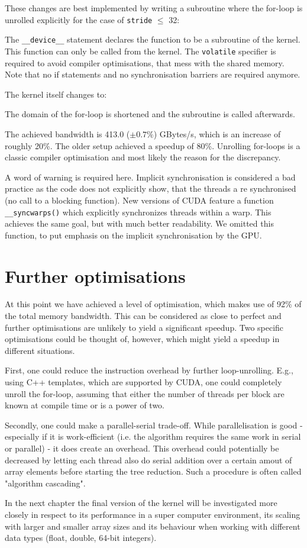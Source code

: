 These changes are best implemented by writing a subroutine where the for-loop is unrolled explicitly for the case of \texttt{stride} \(\le\) 32:

The \texttt{\_\_device\_\_} statement declares the function to be a subroutine of the kernel.
This function can only be called from the kernel.
The \texttt{volatile} specifier is required to avoid compiler optimisations, that mess with the shared memory.
Note that no if statements and no synchronisation barriers are required anymore.

The kernel itself changes to:

The domain of the for-loop is shortened and the subroutine is called afterwards.

The achieved bandwidth is 413.0 (\( \pm 0.7\% \)) GBytes/s, which is an increase of roughly 20\%.
The older setup achieved a speedup of 80\%.
Unrolling for-loops is a classic compiler optimisation and most likely the reason for the discrepancy.

A word of warning is required here.
Implicit synchronisation is considered a bad practice as the code does not explicitly show, that the threads a re synchronised (no call to a blocking function).
New versions of CUDA feature a function \texttt{\_\_syncwarps()} which explicitly synchronizes threads within a warp.
This achieves the same goal, but with much better readability.
We omitted this function, to put emphasis on the implicit synchronisation by the GPU.

\section{Further optimisations}
At this point we have achieved a level of optimisation, which makes use of 92\% of the total memory bandwidth.
This can be considered as close to perfect and further optimisations are unlikely to yield a significant speedup.
Two specific optimisations could be thought of, however, which might yield a speedup in different situations.

First, one could reduce the instruction overhead by further loop-unrolling.
E.g., using C++ templates, which are supported by CUDA, one could completely unroll the for-loop, assuming that either the number of threads per block are known at compile time or is a power of two.

Secondly, one could make a parallel-serial trade-off.
While parallelisation is good - especially if it is work-efficient (i.e. the algorithm requires the same work in serial or parallel) - it does create an overhead.
This overhead could potentially be decreased by letting each thread also do serial addition over a certain amout of array elements before starting the tree reduction.
Such a procedure is often called "algorithm cascading".

In the next chapter the final version of the kernel will be investigated more closely in respect to its performance in a super computer environment, its scaling with larger and smaller array sizes and its behaviour when working with different data types (float, double, 64-bit integers).




